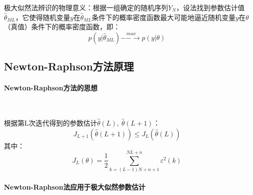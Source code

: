 \documentclass[UTF8]{article}
\begin{document}
极大似然法辨识的物理意义：根据一组确定的随机序列$Y_N$，设法找到参数估计值$\hat{\theta}_{ML}$，它使得随机变量$y$在$\hat{\theta}_{ML}$条件下的概率密度函数最大可能地逼近随机变量$y$在$\theta$（真值）条件下的概率密度函数，即：
\begin{equation*}
    p(y|\hat{\theta}_{ML}) \stackrel{max}{--\rightarrow} p(y|\theta)
\end{equation*}

\subsection{Newton-Raphson方法原理}
\paragraph{Newton-Raphson方法的思想}~{}

根据第L次迭代得到的参数估计$\hat{\theta}(L),\ \hat{\theta}(L + 1)$：
\begin{equation*}
    J_{L + 1}(\hat{\theta}(L + 1)) \le J_L(\hat{\theta}(L)) 
\end{equation*}
其中：
\begin{equation*}
    J_L(\theta) = \frac{1}{2}\sum_{k = (L - 1)N + n + 1}^{NL + n}\varepsilon^2(k) 
\end{equation*}


\paragraph{Newton-Raphson法应用于极大似然参数估计}~{}
\end{document}
